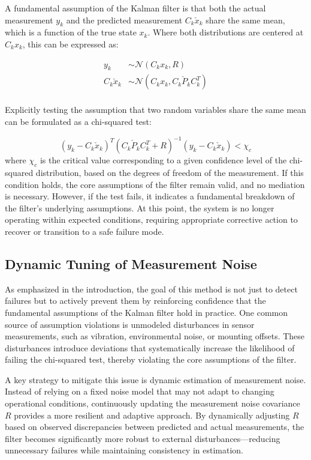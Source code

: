\documentclass[a4paper]{article}
\begin{document}
	A fundamental assumption of the Kalman filter is that both the actual measurement $y_k$ and the predicted measurement $C_k \check{x}_k$ share the same mean, which is a function of the true state $x_k$. Where both distributions are centered at $C_k x_k$, this can be expressed as:

	\begin{align}
		y_k &\sim \mathcal{N} (C_k x_k, R)\\
		C_k \check{x}_k &\sim \mathcal{N} (C_k x_k, C_k \check{P}_k C_k^T)\\
	\end{align}

	Explicitly testing the assumption that two random variables share the same mean can be formulated as a chi-squared test:

	\begin{equation}
		(y_k - C_k \check{x}_k)^T (C_k \check{P}_k C_k^T + R)^{-1} (y_k - C_k \check{x}_k) < \chi_c
		\label{eq:chisquare}
	\end{equation}
	where \( \chi_c \) is the critical value corresponding to a given confidence level of the chi-squared distribution, based on the degrees of freedom of the measurement. If this condition holds, the core assumptions of the filter remain valid, and no mediation is necessary. However, if the test fails, it indicates a fundamental breakdown of the filter’s underlying assumptions. At this point, the system is no longer operating within expected conditions, requiring appropriate corrective action to recover or transition to a safe failure mode.

	\subsection{Dynamic Tuning of Measurement Noise}
	As emphasized in the introduction, the goal of this method is not just to detect failures but to actively prevent them by reinforcing confidence that the fundamental assumptions of the Kalman filter hold in practice. One common source of assumption violations is unmodeled disturbances in sensor measurements, such as vibration, environmental noise, or mounting offsets. These disturbances introduce deviations that systematically increase the likelihood of failing the chi-squared test, thereby violating the core assumptions of the filter.

	A key strategy to mitigate this issue is dynamic estimation of measurement noise. Instead of relying on a fixed noise model that may not adapt to changing operational conditions, continuously updating the measurement noise covariance $R$ provides a more resilient and adaptive approach. By dynamically adjusting $R$ based on observed discrepancies between predicted and actual measurements, the filter becomes significantly more robust to external disturbances—reducing unnecessary failures while maintaining consistency in estimation.
\end{document}
